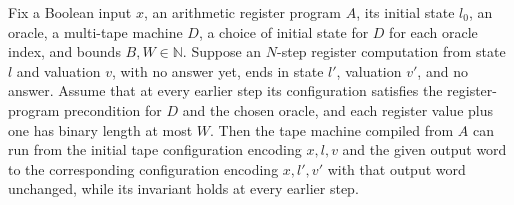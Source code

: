 \begin{theorem}
\label{Complexity.LogProg.arm_reach}
\leanok
{}
Fix a Boolean input $x$, an arithmetic register program $A$, its initial state $l_0$, an
oracle, a multi-tape machine $D$, a choice of initial state for $D$ for each oracle
index, and bounds $B,W\in\mathbb{N}$. Suppose an $N$-step register computation from
state $l$ and valuation $v$, with no answer yet, ends in state $l'$, valuation $v'$, and
no answer. Assume that at every earlier step its configuration satisfies the
register-program precondition for $D$ and the chosen oracle, and each register value
plus one has binary length at most $W$. Then the tape machine compiled from $A$ can run
from the initial tape configuration encoding $x,l,v$ and the given output word to the
corresponding configuration encoding $x,l',v'$ with that output word unchanged, while
its invariant holds at every earlier step.
\end{theorem}
